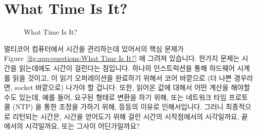 
\section{What Time Is It?}
\label{sec:app:questions:What Time Is It?}

\begin{figure}[htb]
\centering
{}
\caption{What Time Is It?}
\end{figure}

멀티코어 컴퓨터에서 시간을 관리하는데 있어서의 핵심 문제가
Figure~\ref{fig:app:questions:What Time Is It?} 에 그려져 있습니다.
한가지 문제는 시간을 읽는데에도 시간이 걸린다는 점입니다.
하나의 인스트럭션을 통해 하드웨어 시계를 읽을 것이고, 이 읽기 오퍼레이션을
완료하기 위해서 코어 바깥으로 (더 나쁜 경우라면, socket 바깥으로) 나가야 할
겁니다.
또한, 읽어온 값에 대해서 어떤 계산을 해야할 수도 있는데, 예를 들어, 요구된
형태로 변환을 하기 위해, 또는 네트워크 타임 프로토콜 (NTP) 을 통한 조정을
가하기 위해, 등등의 이유로 인해서입니다.
그러니 최종적으로 리턴되는 시간은, 시간을 얻어도기 위해 걸린 시간의
시작점에서의 시각일까요, 끝에서의 시각일까요, 또는 그사이 어딘가일까요?

